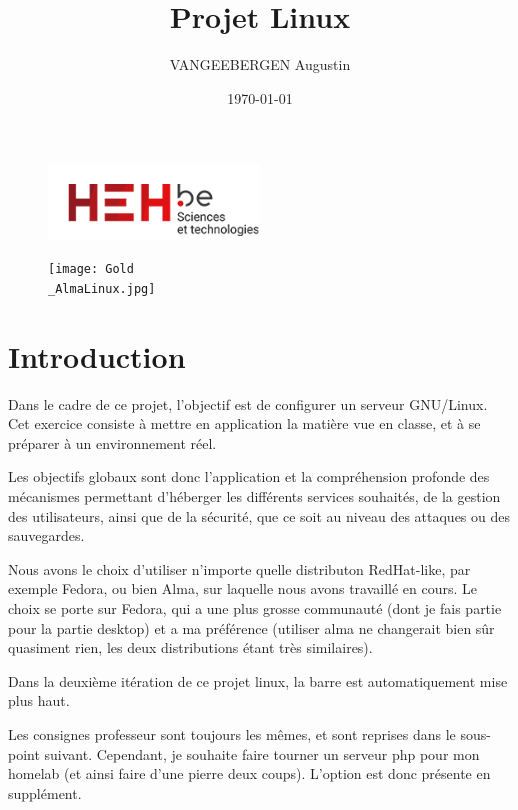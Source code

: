 \documentclass{article}
\title{Projet Linux}
\author{VANGEEBERGEN Augustin}
\date{\today}
\begin{document}
	
	\maketitle
	
	\begin{figure}[h]
		\centering
		\includegraphics[width=0.5\textwidth]{logo.png}
		\label{fig:logoheh}
	\end{figure}
	
	\begin{figure}[h!]
		\centering
		\texttt{[image: Gold\\\_AlmaLinux.jpg]}
		\label{fig:logoheh}
	\end{figure}
	

	
	\newpage


	\tableofcontents
	\newpage
	

	
\section{Introduction}
Dans le cadre de ce projet, l'objectif est de configurer un serveur GNU/Linux. Cet exercice consiste à mettre en application la matière vue en classe, et à se préparer à un environnement réel.
	
Les objectifs globaux sont donc l'application et la compréhension profonde des mécanismes permettant d'héberger les différents services souhaités, de la gestion des utilisateurs, ainsi que de la sécurité, que ce soit au niveau des attaques ou des sauvegardes.

Nous avons le choix d'utiliser n'importe quelle distributon RedHat-like, par exemple Fedora, ou bien Alma, sur laquelle nous avons travaillé en cours.
Le choix se porte sur Fedora, qui a une plus grosse communauté (dont je fais partie pour la partie desktop) et a ma préférence (utiliser alma ne changerait bien sûr quasiment rien, les deux distributions étant très similaires).

Dans la deuxième itération de ce projet linux, la barre est automatiquement mise plus haut.
	
Les consignes professeur sont toujours les mêmes, et sont reprises dans le sous-point suivant. Cependant, je souhaite faire tourner un serveur php pour mon homelab (et ainsi faire d'une pierre deux coups). L'option est donc présente en supplément.
	
\end{document}
